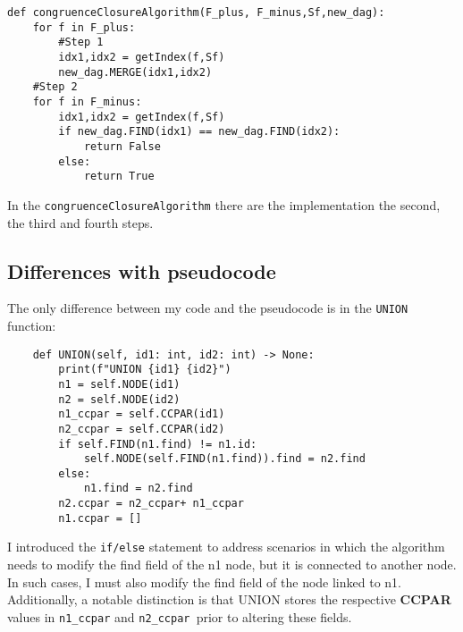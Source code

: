 \documentclass{article}
\begin{document}
\begin{lstlisting}
def congruenceClosureAlgorithm(F_plus, F_minus,Sf,new_dag):
    for f in F_plus:
        #Step 1
        idx1,idx2 = getIndex(f,Sf)
        new_dag.MERGE(idx1,idx2)
    #Step 2
    for f in F_minus:
        idx1,idx2 = getIndex(f,Sf)
        if new_dag.FIND(idx1) == new_dag.FIND(idx2):
            return False
        else:
            return True
\end{lstlisting}


In the \texttt{congruenceClosureAlgorithm} there are the implementation the second, the third and fourth steps.


\subsection{Differences with pseudocode}

The only difference between my code and the pseudocode is in the \texttt{UNION} function:
\begin{lstlisting}
    def UNION(self, id1: int, id2: int) -> None:
        print(f"UNION {id1} {id2}")
        n1 = self.NODE(id1)
        n2 = self.NODE(id2)
        n1_ccpar = self.CCPAR(id1)
        n2_ccpar = self.CCPAR(id2)
        if self.FIND(n1.find) != n1.id:
            self.NODE(self.FIND(n1.find)).find = n2.find
        else:
            n1.find = n2.find
        n2.ccpar = n2_ccpar+ n1_ccpar
        n1.ccpar = []
\end{lstlisting}
I introduced the \texttt{if/else} statement to address scenarios in which the algorithm needs to modify the find field of the n1 node, but it is connected to another node. In such cases, I must also modify the find field of the node linked to n1. Additionally, a notable distinction is that UNION stores the respective \textbf{CCPAR} values in \texttt{n1\_ccpar} and \texttt{n2\_ccpar }prior to altering these fields.

\pagebreak
\end{document}
